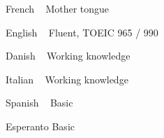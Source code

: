 

\begin{cvskills}

  \cvskill
    {French ~ \emojiflagfr} %
    {Mother tongue} %

  \cvskill
    {English ~ \emojiflagus} %
    {Fluent, TOEIC 965 / 990} %

  \cvskill
    {Danish ~ \emojiflagdk} %
    {Working knowledge} %

  \cvskill
    {Italian ~ \emojiflagit} %
    {Working knowledge} %

  \cvskill
    {Spanish ~ \emojiflages} %
    {Basic} %

  \cvskill
    {Esperanto} %
    {Basic} %

\end{cvskills}
